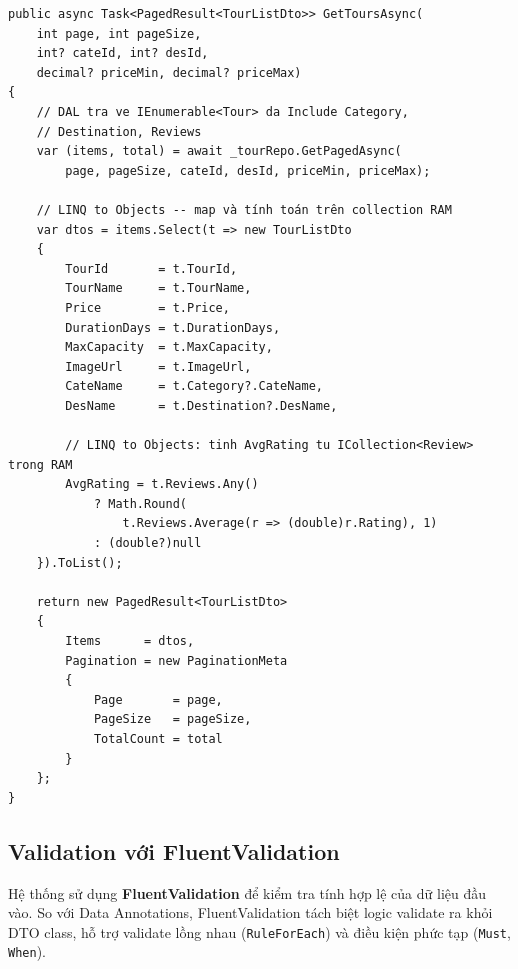 \begin{lstlisting}[style=csharp,
  caption={LINQ to Objects trong TourService},
  label={lst:linqobj}]
public async Task<PagedResult<TourListDto>> GetToursAsync(
    int page, int pageSize,
    int? cateId, int? desId,
    decimal? priceMin, decimal? priceMax)
{
    // DAL tra ve IEnumerable<Tour> da Include Category,
    // Destination, Reviews
    var (items, total) = await _tourRepo.GetPagedAsync(
        page, pageSize, cateId, desId, priceMin, priceMax);

    // LINQ to Objects -- map và tính toán trên collection RAM
    var dtos = items.Select(t => new TourListDto
    {
        TourId       = t.TourId,
        TourName     = t.TourName,
        Price        = t.Price,
        DurationDays = t.DurationDays,
        MaxCapacity  = t.MaxCapacity,
        ImageUrl     = t.ImageUrl,
        CateName     = t.Category?.CateName,
        DesName      = t.Destination?.DesName,

        // LINQ to Objects: tinh AvgRating tu ICollection<Review> trong RAM
        AvgRating = t.Reviews.Any()
            ? Math.Round(
                t.Reviews.Average(r => (double)r.Rating), 1)
            : (double?)null
    }).ToList();  

    return new PagedResult<TourListDto>
    {
        Items      = dtos,
        Pagination = new PaginationMeta
        {
            Page       = page,
            PageSize   = pageSize,
            TotalCount = total
        }
    };
}
\end{lstlisting}

\subsection{Validation với FluentValidation}\label{sub3.3.4}

Hệ thống sử dụng \textbf{FluentValidation} để kiểm tra tính
hợp lệ của dữ liệu đầu vào. So với Data Annotations,
FluentValidation tách biệt logic validate ra khỏi DTO class,
hỗ trợ validate lồng nhau (\texttt{RuleForEach}) và điều kiện
phức tạp (\texttt{Must}, \texttt{When}).

